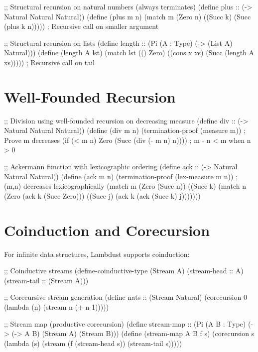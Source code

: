 \begin{example}
\begin{lambdustcode}
;; Structural recursion on natural numbers (always terminates)
(define plus :: (-> Natural Natural Natural))
(define (plus m n)
  (match m
    (Zero n)
    ((Succ k) (Succ (plus k n)))))    ; Recursive call on smaller argument

;; Structural recursion on lists
(define length :: (Pi (A : Type) (-> (List A) Natural)))  
(define (length A lst)
  (match lst
    (() Zero)
    ((cons x xs) (Succ (length A xs)))))   ; Recursive call on tail
\end{lambdustcode}
\end{example}

\section{Well-Founded Recursion}
\label{sec:well-founded}

\begin{example}
\begin{lambdustcode}
;; Division using well-founded recursion on decreasing measure
(define div :: (-> Natural Natural Natural))
(define (div m n)
  (termination-proof (measure m))      ; Prove m decreases
  (if (< m n) 
      Zero
      (Succ (div (- m n) n))))         ; m - n < m when n > 0

;; Ackermann function with lexicographic ordering
(define ack :: (-> Natural Natural Natural))
(define (ack m n)  
  (termination-proof (lex-measure m n))  ; (m,n) decreases lexicographically
  (match m
    (Zero (Succ n))
    ((Succ k) (match n
                (Zero (ack k (Succ Zero)))
                ((Succ j) (ack k (ack (Succ k) j)))))))
\end{lambdustcode}
\end{example}

\section{Coinduction and Corecursion}
\label{sec:coinduction}

For infinite data structures, Lambdust supports coinduction:

\begin{example}
\begin{lambdustcode}
;; Coinductive streams  
(define-coinductive-type (Stream A)
  (stream-head :: A)
  (stream-tail :: (Stream A)))

;; Corecursive stream generation
(define nats :: (Stream Natural)
  (corecursion 0 
    (lambda (n) 
      (stream n (+ n 1)))))

;; Stream map (productive corecursion)
(define stream-map :: (Pi (A B : Type) (-> (-> A B) (Stream A) (Stream B)))
(define (stream-map A B f s)
  (corecursion s
    (lambda (s)
      (stream (f (stream-head s)) 
              (stream-tail s)))))
\end{lambdustcode}
\end{example}

